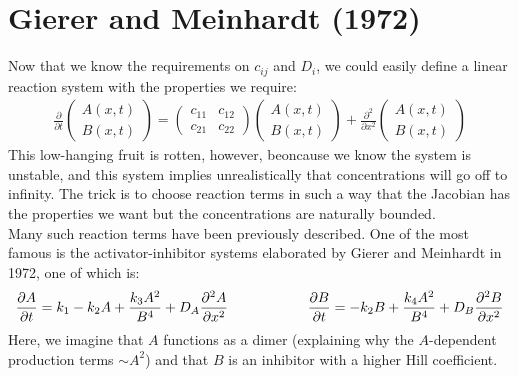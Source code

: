 \documentclass{article}
\begin{document}
\section*{Gierer and Meinhardt (1972)}

Now that we know the requirements on $c_{ij}$ and $D_i$, we could easily define a linear reaction system with the properties we require:
\begin{eqnarray*}
 \frac{\partial }{\partial t} \begin{pmatrix} A (x,t) \\ B (x,t) \end{pmatrix} =  \begin{pmatrix} c_{11} & c_{12} \\ c_{21} & c_{22} \end{pmatrix} \begin{pmatrix} A (x,t) \\ B (x,t) \end{pmatrix} + \frac{\partial^2}{\partial x^2} \begin{pmatrix} A (x,t) \\ B (x,t) \end{pmatrix} 
 \end{eqnarray*}
This low-hanging fruit is rotten, however, beoncause we know the system is unstable, and this system implies unrealistically that concentrations will go off to infinity. The trick is to choose reaction terms in such a way that the Jacobian has the properties we want but the concentrations are naturally bounded.\\

Many such reaction terms have been previously described. One of the most famous is the activator-inhibitor systems elaborated by Gierer and Meinhardt in 1972, one of which is:
\[ \frac{\partial A}{\partial t} = k_1 - k_2 A + \frac{k_3 A^2}{B^4} + D_A \frac{\partial^2 A}{\partial x^2} \hspace{ 2 cm}  \frac{\partial B}{\partial t} = - k_2 B + \frac{k_4 A^2}{B^4} + D_B \frac{\partial^2 B}{\partial x^2} \]
Here, we imagine that $A$ functions as a dimer (explaining why the $A$-dependent production terms $\sim A^2$) and that $B$ is an inhibitor with a higher Hill coefficient.
\end{document}
